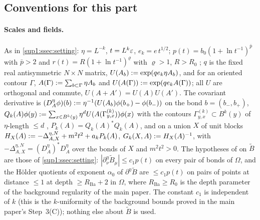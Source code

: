 \subsection*{Conventions for this part}

\paragraph{Scales and fields.} As in \cref{sup1:ssec:setting}: $\eta=L^{-k}$, $t=L^k\varepsilon$, $e_k=e\,t^{1/2}$; $p(t)=b_0(1+\ln t^{-1})^{\bar p}$ with $\bar p>2$ and $r(t)=R(1+\ln t^{-1})^{\varrho}$ with $\varrho>1$, $R>R_0$ \cite[(2.3), (2.7)]{Ba2}; $q$ is the fixed real antisymmetric $N\times N$ matrix, $U(A_b):=\exp(qe_k\eta A_b)$, and for an oriented contour $\Gamma$, $A(\Gamma):=\sum_{b\subset\Gamma}\eta A_b$ and $U(A(\Gamma)):=\exp(qe_kA(\Gamma))$; all $U$ are orthogonal and commute, $U(A+A')=U(A)U(A')$. The covariant derivative is $(D^\eta_A\phi)(b):=\eta^{-1}(U(A_b)\phi(b_+)-\phi(b_-))$ on the bond $b=(b_-,b_+)$, $Q_k(A)\phi(y):=\sum_{x\in B^k(y)}\eta^dU(A(\Gamma^{(k)}_{y,x}))\phi(x)$ with the contours $\Gamma^{(k)}_{y,x}\subset B^k(y)$ of $\eta$-length $\le d$ \cite[(1.13)]{Ba3}, $P_k(A)=Q_k(A)^*Q_k(A)$, and on a union $X$ of unit blocks $H_X(A):=-\Delta^{\eta,N}_{A,X}+m^2t^2+a_kP_k(A)$, $G_k(X,A):= H_X(A)^{-1}$, with $-\Delta^{\eta,N}_{A,X}=(D^\eta_A)^*D^\eta_A$ over the bonds of $X$ and $m^2t^2>0$. The hypotheses of \cite[p.~412]{Ba3} on $\tilde B$ are those of \cref{sup1:ssec:setting}: $|\partial^\eta_\nu\tilde B_\mu|\le c_1p(t)$ on every pair of bonds of $\Omega$, and the H\"older quotients of exponent $\alpha_0$ of $\partial^\eta\tilde B$ are $\le c_1p(t)$ on pairs of points at distance $\le1$ at depth $\ge R_{\mathrm{Ba}}+2$ in $\Omega$, where $R_{\mathrm{Ba}}\ge R_0$ is the depth parameter of the background regularity of the main paper. The constant $c_1$ is independent of $k$ (this is the $k$-uniformity of the background bounds proved in the main paper's Step~3(C)); nothing else about $\tilde B$ is used.

